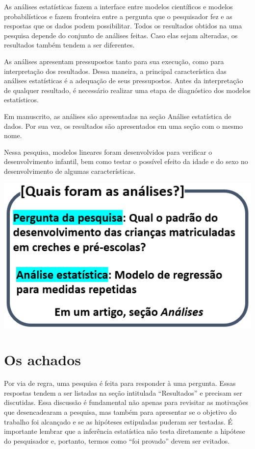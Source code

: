 \documentclass[
]{book}
\begin{document}
As análises estatísticas fazem a interface entre modelos científicos e modelos probabilísticos e fazem fronteira entre a pergunta que o pesquisador fez e as respostas que os dados podem possibilitar. Todos os resultados obtidos na uma pesquisa depende do conjunto de análises feitas. Caso elas sejam alteradas, os resultados também tendem a ser diferentes.

As análises apresentam pressupostos tanto para sua execução, como para interpretação dos resultados. Dessa maneira, a principal característica das análises estatísticas é a adequação de seus pressupostos. Antes da interpretação de qualquer resultado, é necessário realizar uma etapa de diagnóstico dos modelos estatísticos.

Em manuscrito, as análises são apresentadas na seção Análise estatística de dados. Por sua vez, os resultados são apresentados em uma seção com o mesmo nome.

Nessa pesquisa, modelos lineares foram desenvolvidos para verificar o desenvolvimento infantil, bem como testar o possível efeito da idade e do sexo no desenvolvimento de algumas características.

\includegraphics{./img/cap_pesquisa_aplicada_analises.png}

\hypertarget{os-achados}{%
\section{Os achados}\label{os-achados}}

Por via de regra, uma pesquisa é feita para responder à uma pergunta. Essas respostas tendem a ser listadas na seção intitulada ``Resultados'' e precisam ser discutidas. Essa discussão é fundamental não apenas para revisitar as motivações que desencadearam a pesquisa, mas também para apresentar se o objetivo do trabalho foi alcançado e se as hipóteses estipuladas puderam ser testadas. É importante lembrar que a inferência estatística não testa diretamente a hipótese do pesquisador e, portanto, termos como ``foi provado'' devem ser evitados.
\end{document}
